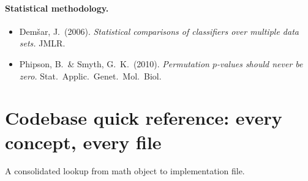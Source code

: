 \documentclass[11pt,a4paper]{article}
\theoremstyle{remark}
\begin{document}
\paragraph{Statistical methodology.}
\begin{itemize}
\item Demšar, J.\ (2006). \emph{Statistical comparisons of classifiers over multiple data sets.} JMLR.
\item Phipson, B.\ \& Smyth, G.\ K.\ (2010). \emph{Permutation $p$-values should never be zero.} Stat.\ Applic.\ Genet.\ Mol.\ Biol.
\end{itemize}

\section{Codebase quick reference: every concept, every file}

A consolidated lookup from math object to implementation file.
\end{document}
